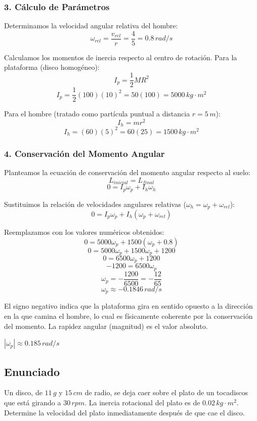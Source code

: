 \documentclass[12pt, a4paper]{article}
\begin{document}
\subsubsection*{3. Cálculo de Parámetros}
Determinamos la velocidad angular relativa del hombre:
$$\omega_{rel} = \frac{v_{rel}}{r} = \frac{4}{5} = 0.8 \, \si{rad/s}$$

Calculamos los momentos de inercia respecto al centro de rotación.
Para la plataforma (disco homogéneo):
$$I_p = \frac{1}{2} M R^2$$
$$I_p = \frac{1}{2} (100) (10)^2 = 50(100) = 5000 \, \si{kg\cdot m^2}$$

Para el hombre (tratado como partícula puntual a distancia $r=5 \, \si{m}$):
$$I_h = m r^2$$
$$I_h = (60) (5)^2 = 60(25) = 1500 \, \si{kg\cdot m^2}$$

\subsubsection*{4. Conservación del Momento Angular}
Planteamos la ecuación de conservación del momento angular respecto al suelo:
$$L_{inicial} = L_{final}$$
$$0 = I_p \omega_p + I_h \omega_h$$

Sustituimos la relación de velocidades angulares relativas ($\omega_h = \omega_p + \omega_{rel}$):
$$0 = I_p \omega_p + I_h (\omega_p + \omega_{rel})$$

Reemplazamos con los valores numéricos obtenidos:
$$0 = 5000 \omega_p + 1500 (\omega_p + 0.8)$$
$$0 = 5000 \omega_p + 1500 \omega_p + 1200$$
$$0 = 6500 \omega_p + 1200$$
$$-1200 = 6500 \omega_p$$
$$\omega_p = -\frac{1200}{6500} = -\frac{12}{65}$$
$$\omega_p \approx -0.1846 \, \si{rad/s}$$

El signo negativo indica que la plataforma gira en sentido opuesto a la dirección en la que camina el hombre, lo cual es físicamente coherente por la conservación del momento. La rapidez angular (magnitud) es el valor absoluto.

\begin{tcolorbox}[colback=green!5!white, colframe=green!50!black, title=Respuesta Final]
\centering \Large $|\omega_p| \approx 0.185 \, \si{rad/s}$
\end{tcolorbox}

\newpage

\subsection*{Enunciado}
Un disco, de $11 \, \si{g}$ y $15 \, \si{cm}$ de radio, se deja caer sobre el plato de un tocadiscos que está girando a $30 \, \si{rpm}$. La inercia rotacional del plato es de $0.02 \, \si{kg\cdot m^2}$. Determine la velocidad del plato inmediatamente después de que cae el disco.
\end{document}
